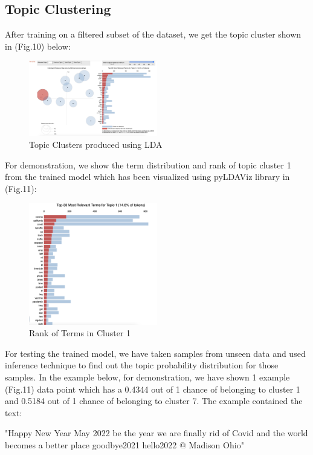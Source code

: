 \subsection{Topic Clustering}
After training on a filtered subset of the dataset, we get the topic cluster shown in (Fig.10) below: 
    \begin{figure}[H]
        \centering
        \includegraphics[width=0.5\textwidth]{imgs/cluster_topics.png}
        \caption{Topic Clusters produced using LDA}
        \label{fig:lda_topic}
    \end{figure}
For demonstration, we show the term distribution and rank of topic cluster 1
from the trained model which has been visualized using pyLDAViz library in
(Fig.11):
\begin{figure}[H]
    \centering
    \includegraphics[width=0.5\textwidth]{imgs/term_ranks.png}
    \caption{Rank of Terms in Cluster 1}
    \label{fig:my_label}
\end{figure}
For testing the trained model, we have taken samples from unseen data and used
inference technique to find out the topic probability distribution for those
samples. In the example below, for demonstration, we have shown 1 example
(Fig.11) data point which has a 0.4344 out of 1 chance of belonging to
cluster 1 and 0.5184 out of 1 chance of belonging to cluster 7. The example
contained the text: 
\begin{displayquote}
"Happy New Year May 2022 be the year we are finally rid of Covid and the world
 becomes a better place goodbye2021 hello2022 @ Madison Ohio"
\end{displayquote}


